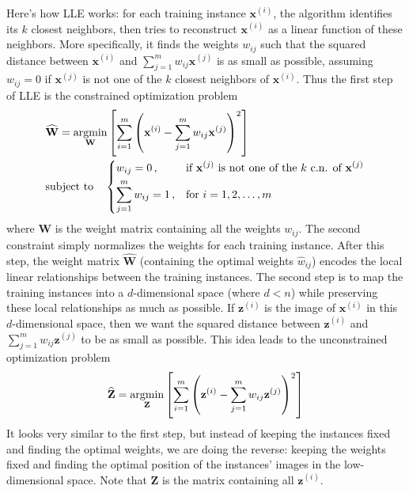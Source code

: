 Here’s how LLE works: for each training instance $\mathbf{x}^{(i)}$, the algorithm identifies its $k$ closest neighbors, then tries to reconstruct $\mathbf{x}^{(i)}$ as a linear function of these neighbors. More specifically, it finds the weights $w_{ij}$ such that the squared distance between $\mathbf{x}^{(i)}$ and $\sum_{j=1}^mw_{ij}\mathbf{x}^{(j)}$ is as small as possible, assuming $w_{ij}=0$ if $\mathbf{x}^{(j)}$ is not one of the $k$ closest neighbors of $\mathbf{x}^{(i)}$. Thus the first step of LLE is the constrained optimization problem
\begin{align*}
&\widehat{\mathbf{W}}=\operatorname*{argmin}_{\mathbf{W}}{\left[\sum_{i=1}^m{\left(\mathbf{x}^{(i)}-\sum_{j=1}^mw_{ij}\mathbf{x}^{(j)}\right)}^2\right]}\\
&\text{subject to}\quad\begin{dcases}
w_{ij}=0\,,&\text{if $\mathbf{x}^{(j)}$ is not one of the $k$ c.n. of $\mathbf{x}^{(j)}$}\\
\sum_{j=1}^mw_{ij}=1\,,&\text{for $i=1,2,\ldots,m$}
\end{dcases}
\end{align*}
where $\mathbf{W}$ is the weight matrix containing all the weights $w_{ij}$. The second constraint simply normalizes the weights for each training instance. After this step, the weight matrix $\widehat{\mathbf{W}}$ (containing the optimal weights $\widehat{w}_{ij}$) encodes the local linear relationships between the training instances. The second step is to map the training instances into a $d$-dimensional space (where $d<n$) while preserving these local relationships as much as possible. If $\mathbf{z}^{(i)}$ is the image of $\mathbf{x}^{(i)}$ in this $d$-dimensional space, then we want the squared distance between $\mathbf{z}^{(i)}$ and $\sum_{j=1}^mw_{ij}\mathbf{z}^{(j)}$ to be as small as possible. This idea leads to the unconstrained optimization problem
\begin{equation}
\widehat{\mathbf{Z}}=\operatorname*{argmin}_{\mathbf{Z}}{\left[\sum_{i=1}^m{\left(\mathbf{z}^{(i)}-\sum_{j=1}^mw_{ij}\mathbf{z}^{(j)}\right)}^2\right]}
\end{equation}
It looks very similar to the first step, but instead of keeping the instances fixed and finding the optimal weights, we are doing the reverse: keeping the weights fixed and finding the optimal position of the instances' images in the low-dimensional space. Note that $\mathbf{Z}$ is the matrix containing all $\mathbf{z}^{(i)}$.
